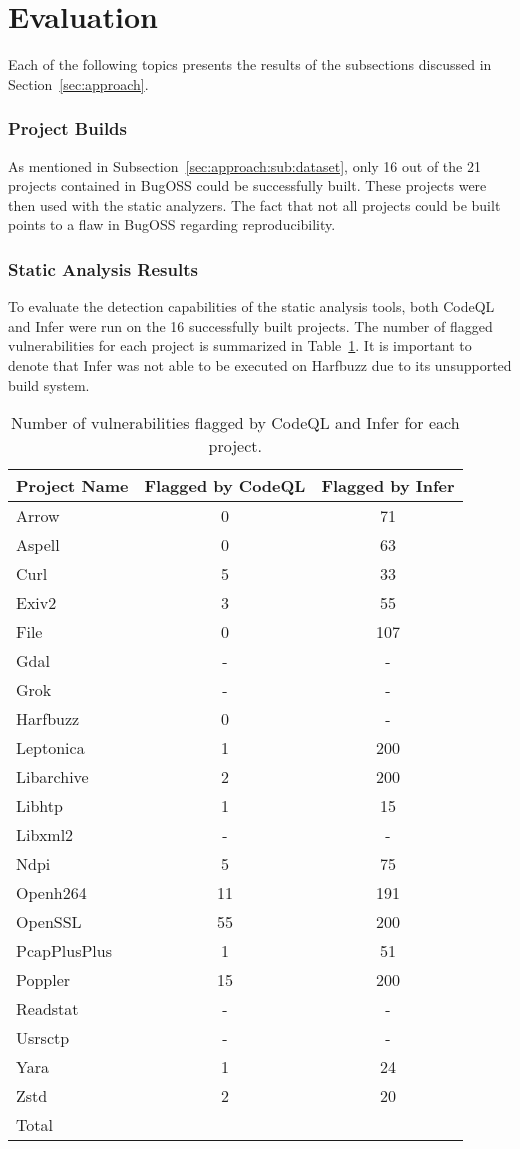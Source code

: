 \section{Evaluation}
\label{sec:eval}
Each of the following topics presents the results of the subsections discussed in Section~\ref{sec:approach}.

\subsubsection{Project Builds}
As mentioned in Subsection~\ref{sec:approach:sub:dataset}, only 16 out of the 21 projects contained in BugOSS could be successfully built. These projects were then used with the static analyzers. The fact that not all projects could be built points to a flaw in BugOSS regarding reproducibility.

\subsubsection{Static Analysis Results}
To evaluate the detection capabilities of the static analysis tools, both CodeQL and Infer were run on the 16 successfully built projects. The number of flagged vulnerabilities for each project is summarized in Table~\ref{sast_results}. It is important to denote that Infer was not able to be executed on Harfbuzz due to its unsupported build system.

\begin{table}[ht]
\centering
\caption{Number of vulnerabilities flagged by CodeQL and Infer for each project.}
\label{sast_results}
\begin{tabular}{|l|c|c|}
\hline
\textbf{Project Name} & \textbf{Flagged by CodeQL} & \textbf{Flagged by Infer} \\
\hline
Arrow & 0 & 71 \\
Aspell & 0 & 63 \\
Curl & 5 & 33 \\
Exiv2 & 3 & 55 \\
File & 0 & 107 \\
Gdal & - & - \\
Grok & - & - \\
Harfbuzz & 0 & - \\
Leptonica & 1 & 200 \\
Libarchive & 2 & 200 \\
Libhtp & 1 & 15 \\
Libxml2 & - & - \\
Ndpi & 5 & 75 \\
Openh264 & 11 & 191 \\
OpenSSL & 55 & 200 \\
PcapPlusPlus & 1 & 51 \\
Poppler & 15 & 200 \\
Readstat & - & - \\
Usrsctp & - & - \\
Yara & 1 & 24 \\
Zstd & 2 & 20 \\
\hline
Total & \textbf{} & \textbf{} \\
\hline
\end{tabular}
\end{table}

